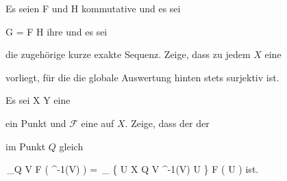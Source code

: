 {}
{





Es seien
\mathkor {} {F} {und} {H} {}
kommutative
und es sei

\mavergleichskette
{\vergleichskette
{ G
}
{ = }{ F \times H
}
{  }{
}
{    }{
}
{   }{
}
}
{}{}{}
ihre
 {} {}
und es sei

 {  }

die zugehörige kurze exakte Sequenz. Zeige, dass zu jedem
$X$ eine

 {  }

vorliegt, für die die globale Auswertung hinten stets surjektiv ist.





}
{} {}

{}
{





Es sei
\maabb {\varphi} { X } { Y
} {}
eine

 ein Punkt und ${ \mathcal  F   }$ eine
auf $X$. Zeige, dass der
der

 im Punkt $Q$ gleich

\mavergleichskettedisphandlinks
{\vergleichskettedisphandlinks
{ \,_{Q \in V } { \mathcal  F   } \left(  \varphi^{-1}(V)  \right)
}
{ =} { \,_{ \left\{  U \subseteq X  \mid  {} Q \in V  \varphi^{-1}(V) \subseteq U         \right\}  } { \mathcal  F   } \left(  U   \right)
}
{ } {
}
{ } {
}
{ } {
}
}
{}{}{}
ist.





}
{} {}

